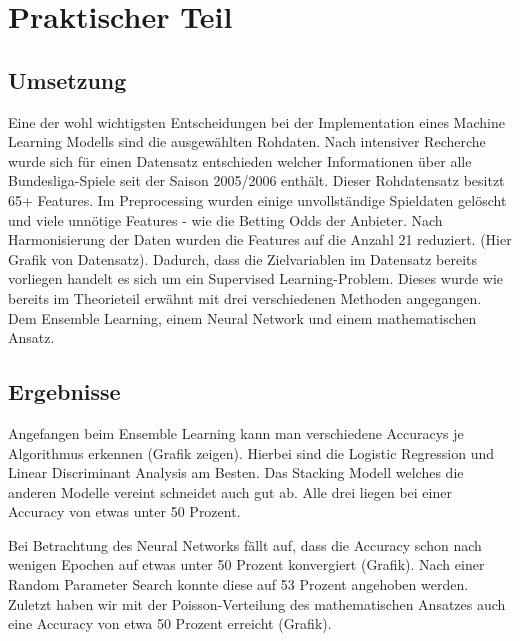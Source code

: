 \chapter{Praktischer Teil}

\section{Umsetzung}

Eine der wohl wichtigsten Entscheidungen bei der Implementation eines Machine Learning Modells sind die ausgewählten Rohdaten. Nach intensiver Recherche wurde sich für einen Datensatz entschieden welcher Informationen über alle Bundesliga-Spiele seit der Saison 2005/2006 enthält. Dieser Rohdatensatz besitzt 65+ Features. Im Preprocessing wurden einige unvollständige Spieldaten gelöscht und viele unnötige Features - wie die Betting Odds der Anbieter. Nach Harmonisierung der Daten wurden die Features auf die Anzahl 21 reduziert.  (Hier Grafik von Datensatz). Dadurch, dass die Zielvariablen im Datensatz bereits vorliegen handelt es sich um ein Supervised Learning-Problem. Dieses wurde wie bereits im Theorieteil erwähnt mit drei verschiedenen Methoden angegangen. Dem Ensemble Learning, einem Neural Network und einem mathematischen Ansatz.

\section{Ergebnisse}

Angefangen beim Ensemble Learning kann man verschiedene Accuracys je Algorithmus erkennen (Grafik zeigen). Hierbei sind die Logistic Regression und Linear Discriminant Analysis am Besten. Das Stacking Modell welches die anderen Modelle vereint schneidet auch gut ab. Alle drei liegen bei einer Accuracy von etwas unter 50 Prozent.

Bei Betrachtung des Neural Networks fällt auf, dass die Accuracy schon nach wenigen Epochen auf etwas unter 50 Prozent konvergiert (Grafik). Nach einer Random Parameter Search konnte diese auf 53 Prozent angehoben werden. Zuletzt haben wir mit der Poisson-Verteilung des mathematischen Ansatzes auch eine Accuracy von etwa 50 Prozent erreicht (Grafik). 
